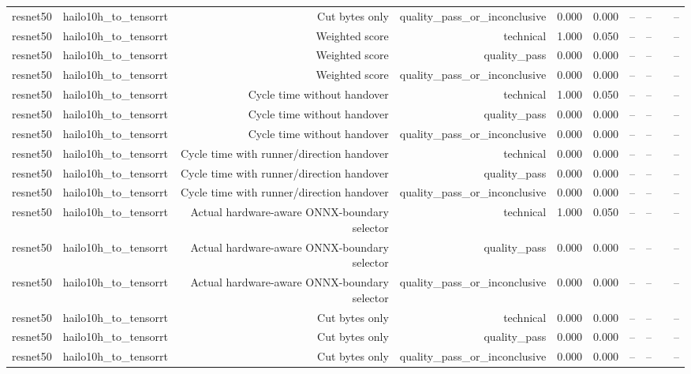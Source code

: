 \begin{table}[t]
\begin{tabular}{lrrrrrrrrr}
resnet50 & hailo10h\_to\_tensorrt & Cut bytes only & quality\_pass\_or\_inconclusive & 0.000 & 0.000 & -- & -- &  & -- \\
resnet50 & hailo10h\_to\_tensorrt & Weighted score & technical & 1.000 & 0.050 & -- & -- &  & -- \\
resnet50 & hailo10h\_to\_tensorrt & Weighted score & quality\_pass & 0.000 & 0.000 & -- & -- &  & -- \\
resnet50 & hailo10h\_to\_tensorrt & Weighted score & quality\_pass\_or\_inconclusive & 0.000 & 0.000 & -- & -- &  & -- \\
resnet50 & hailo10h\_to\_tensorrt & Cycle time without handover & technical & 1.000 & 0.050 & -- & -- &  & -- \\
resnet50 & hailo10h\_to\_tensorrt & Cycle time without handover & quality\_pass & 0.000 & 0.000 & -- & -- &  & -- \\
resnet50 & hailo10h\_to\_tensorrt & Cycle time without handover & quality\_pass\_or\_inconclusive & 0.000 & 0.000 & -- & -- &  & -- \\
resnet50 & hailo10h\_to\_tensorrt & Cycle time with runner/direction handover & technical & 0.000 & 0.000 & -- & -- &  & -- \\
resnet50 & hailo10h\_to\_tensorrt & Cycle time with runner/direction handover & quality\_pass & 0.000 & 0.000 & -- & -- &  & -- \\
resnet50 & hailo10h\_to\_tensorrt & Cycle time with runner/direction handover & quality\_pass\_or\_inconclusive & 0.000 & 0.000 & -- & -- &  & -- \\
resnet50 & hailo10h\_to\_tensorrt & Actual hardware-aware ONNX-boundary selector & technical & 1.000 & 0.050 & -- & -- &  & -- \\
resnet50 & hailo10h\_to\_tensorrt & Actual hardware-aware ONNX-boundary selector & quality\_pass & 0.000 & 0.000 & -- & -- &  & -- \\
resnet50 & hailo10h\_to\_tensorrt & Actual hardware-aware ONNX-boundary selector & quality\_pass\_or\_inconclusive & 0.000 & 0.000 & -- & -- &  & -- \\
resnet50 & hailo10h\_to\_tensorrt & Cut bytes only & technical & 0.000 & 0.000 & -- & -- &  & -- \\
resnet50 & hailo10h\_to\_tensorrt & Cut bytes only & quality\_pass & 0.000 & 0.000 & -- & -- &  & -- \\
resnet50 & hailo10h\_to\_tensorrt & Cut bytes only & quality\_pass\_or\_inconclusive & 0.000 & 0.000 & -- & -- &  & -- \\

\end{tabular}
\end{table}

